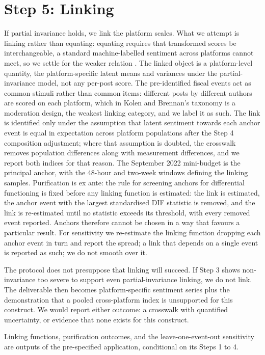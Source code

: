 
\section{Step 5: Linking}
\label{sec:linking}

If partial invariance holds, we link the platform scales. What we attempt is linking rather than equating: equating requires that transformed scores be interchangeable, a standard machine-labelled sentiment across platforms cannot meet, so we settle for the weaker relation \citep{kolen2014}. The linked object is a platform-level quantity, the platform-specific latent means and variances under the partial-invariance model, not any per-post score. The pre-identified fiscal events act as common stimuli rather than common items: different posts by different authors are scored on each platform, which in Kolen and Brennan's taxonomy is a moderation design, the weakest linking category, and we label it as such. The link is identified only under the assumption that latent sentiment towards each anchor event is equal in expectation across platform populations after the Step 4 composition adjustment; where that assumption is doubted, the crosswalk removes population differences along with measurement differences, and we report both indices for that reason. The September 2022 mini-budget is the principal anchor, with the 48-hour and two-week windows defining the linking samples. Purification is ex ante: the rule for screening anchors for differential functioning is fixed before any linking function is estimated: the link is estimated, the anchor event with the largest standardised DIF statistic is removed, and the link is re-estimated until no statistic exceeds its threshold, with every removed event reported. Anchors therefore cannot be chosen in a way that favours a particular result. For sensitivity we re-estimate the linking function dropping each anchor event in turn and report the spread; a link that depends on a single event is reported as such; we do not smooth over it.

The protocol does not presuppose that linking will succeed. If Step 3 shows non-invariance too severe to support even partial-invariance linking, we do not link. The deliverable then becomes platform-specific sentiment series plus the demonstration that a pooled cross-platform index is unsupported for this construct. We would report either outcome: a crosswalk with quantified uncertainty, or evidence that none exists for this construct.

Linking functions, purification outcomes, and the leave-one-event-out sensitivity are outputs of the pre-specified application, conditional on its Steps 1 to 4.
